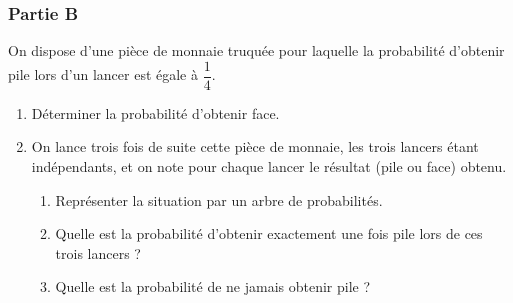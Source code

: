 \documentclass[10pt]{article}
\begin{document}
\subsubsection*{Partie B}
On dispose d'une pièce de monnaie truquée pour laquelle la probabilité d'obtenir pile lors d'un lancer est égale à $\dfrac{1}{4}$.

\begin{enumerate}
\item Déterminer la probabilité d'obtenir face.

\item On lance trois fois de suite cette pièce de monnaie, les trois lancers étant indépendants, et on note pour chaque lancer le résultat (pile ou face) obtenu.

\begin{enumerate}
\item Représenter la situation par un arbre de probabilités.

\item Quelle est la probabilité d'obtenir exactement une fois pile lors de ces trois lancers ?

\item Quelle est la probabilité de ne jamais obtenir pile ?
\end{enumerate}
\end{enumerate}
\end{document}
